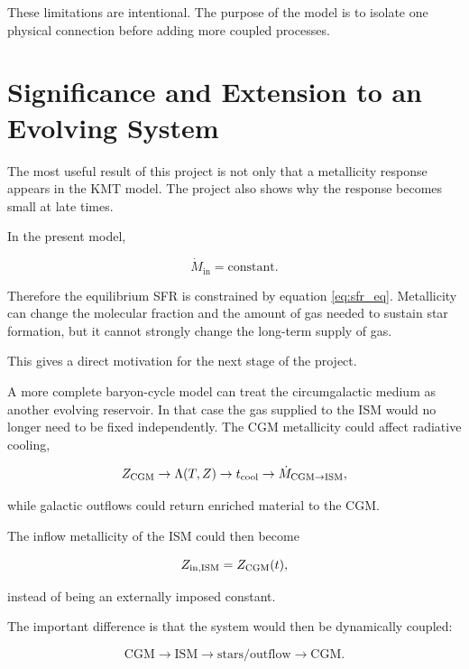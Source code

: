 \documentclass[10pt,a4paper]{article}
\newcommand{\Mgin}{\dot{M}_{\mathrm{in}}}
\begin{document}
These limitations are intentional. The purpose of the model is to isolate one physical connection before adding more coupled processes.

\section{Significance and Extension to an Evolving System}

The most useful result of this project is not only that a metallicity response appears in the KMT model. The project also shows why the response becomes small at late times.

In the present model,

\begin{equation}
\Mgin=\mathrm{constant}.
\end{equation}

Therefore the equilibrium SFR is constrained by equation \ref{eq:sfr_eq}. Metallicity can change the molecular fraction and the amount of gas needed to sustain star formation, but it cannot strongly change the long-term supply of gas.

This gives a direct motivation for the next stage of the project.

A more complete baryon-cycle model can treat the circumgalactic medium as another evolving reservoir. In that case the gas supplied to the ISM would no longer need to be fixed independently. The CGM metallicity could affect radiative cooling,

\begin{equation}
Z_{\rm CGM}
\rightarrow
\Lambda(T,Z)
\rightarrow
t_{\rm cool}
\rightarrow
\dot{M}_{\rm CGM\rightarrow ISM},
\end{equation}

while galactic outflows could return enriched material to the CGM.

The inflow metallicity of the ISM could then become

\begin{equation}
Z_{\rm in,ISM}
=
Z_{\rm CGM}(t),
\end{equation}

instead of being an externally imposed constant.

The important difference is that the system would then be dynamically coupled:

\begin{equation}
\mathrm{CGM}
\rightarrow
\mathrm{ISM}
\rightarrow
\mathrm{stars/outflow}
\rightarrow
\mathrm{CGM}.
\end{equation}
\end{document}
